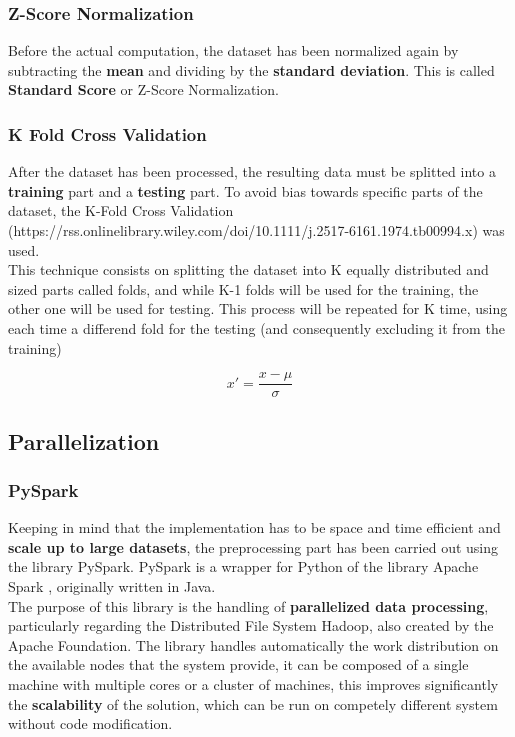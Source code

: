 \documentclass[
	letterpaper, %
	10pt, %
]{class}
\begin{document}
\subsubsection{Z-Score Normalization}
Before the actual computation, the dataset has been normalized again by subtracting the \textbf{mean} and dividing by the \textbf{standard deviation}. This is called \textbf{Standard Score} \cite{normalization} or Z-Score Normalization.

\subsubsection{K Fold Cross Validation}
After the dataset has been processed, the resulting data must be splitted into a \textbf{training} part and a \textbf{testing} part. To avoid bias towards specific parts of the dataset, the K-Fold Cross Validation (https://rss.onlinelibrary.wiley.com/doi/10.1111/j.2517-6161.1974.tb00994.x) \cite{crossvalidation} was used.\\
This technique consists on splitting the dataset into K equally distributed and sized parts called folds, and while K-1 folds will be used for the training, the other one will be used for testing. This process will be repeated for K time, using each time a differend fold for the testing (and consequently excluding it from the training)

$$ x' = \frac{x - \mu}{\sigma} $$

\subsection{Parallelization}

\subsubsection{PySpark}
Keeping in mind that the implementation has to be space and time efficient and \textbf{scale up to large datasets}, the preprocessing part has been carried out using the library PySpark.
PySpark is a wrapper for Python of the library Apache Spark \cite{spark}, originally written in Java.\\

The purpose of this library is the handling of \textbf{parallelized data processing}, particularly regarding the Distributed File System Hadoop, also created by the Apache Foundation.
The library handles automatically the work distribution on the available nodes that the system provide, it can be composed of a single machine with multiple cores or a cluster of machines, this improves significantly the \textbf{scalability} of the solution, which can be run on competely different system without code modification.\\
\end{document}
